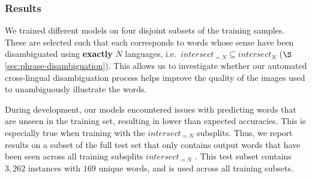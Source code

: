 \documentclass[twocolumn]{svjour3}          \smartqed  \usepackage{graphicx}
\begin{document}
\subsubsection{Results}
\label{sec:gapfilling-results}

We trained different models on four disjoint subsets of the training samples. These are selected such that each corresponds to words whose sense have been disambiguated using \textbf{exactly} $N$ languages, i.e.\ $intersect_{=N} \subseteq intersect_{N}$ ($\S$\ref{sec:phrase-disambiguation}). This allows us to investigate whether our automated cross-lingual  disambiguation process helps improve the quality of the images used to unambiguously illustrate the words.

During development, our models encountered issues with predicting words that are unseen in the training set, resulting in lower than expected accuracies. This is especially true when training with the $intersect_{=N}$ subsplits. Thus, we report results on a subset of the full test set that only contains output words that have been seen across all training subsplits $intersect_{=N}$ . This test subset contains $3,262$ instances with $169$ unique words, and is used across all training subsets.
\begin{table}[t]
    \caption{Accuracy and word similarity scores for our baseline (text-only) models on the fill-in-the-blank task, evaluated on the test subset and trained on the full training set.}
    \label{tbl:gapfilling-baseline}
    \centering
\end{table}
\end{document}
